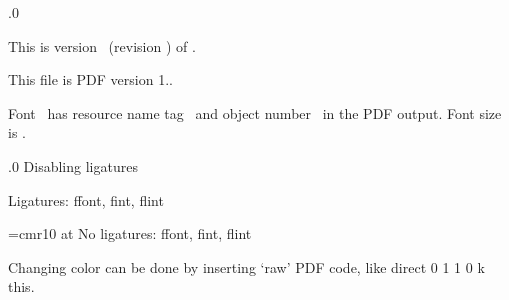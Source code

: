 .0
\fi                  %


This is version \the\pdftexversion\ (revision \pdftexrevision) of \pdfTeX.


This file is PDF version 1.\the\pdfminorversion.
\bigskip


Font \fontname\font\ has resource name tag
\pdffontname\font\ and object number \pdffontobjnum\font\ in the PDF output.
Font size is \pdffontsize\font.\par

.0 {Disabling ligatures}

Ligatures: ffont, fint, flint\par
{\font\noli=cmr10 at\pdffontsize\font
 \pdfnoligatures\noli No ligatures: ffont, fint, flint}
\bigskip

\endfeature


\pdfincludechars{}


Changing color can be done by inserting `raw' PDF code, like
\pdfliteral direct {0 1 1 0 k} %
this.


